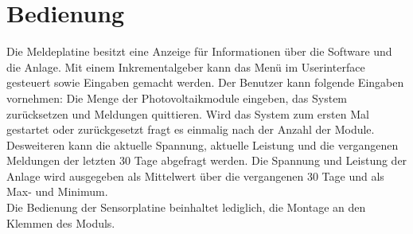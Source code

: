 %
%
%
\section{Bedienung}
Die Meldeplatine besitzt eine Anzeige für Informationen über die Software und die Anlage. Mit einem Inkrementalgeber kann das Menü im Userinterface gesteuert sowie Eingaben gemacht werden. Der Benutzer kann folgende Eingaben vornehmen: Die Menge der Photovoltaikmodule eingeben, das System zurücksetzen und Meldungen quittieren. Wird das System zum ersten Mal gestartet oder zurückgesetzt fragt es einmalig nach der Anzahl der Module.\\
Desweiteren kann die aktuelle Spannung, aktuelle Leistung und die vergangenen Meldungen der letzten 30 Tage abgefragt werden. Die Spannung und Leistung der Anlage wird ausgegeben als Mittelwert über die vergangenen 30 Tage und als Max- und Minimum.\\
Die Bedienung der Sensorplatine beinhaltet lediglich, die Montage an den Klemmen des Moduls.
%